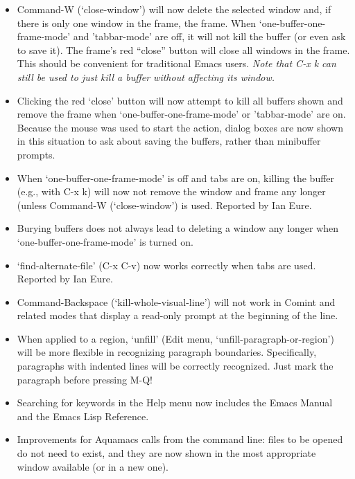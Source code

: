 \begin{itemize}
\item Command-W (`close-window') will now delete the selected window and, if there is only one window in the frame, the frame.  When `one-buffer-one-frame-mode' and 'tabbar-mode' are off, it will not kill the buffer (or even ask to save it).   The frame's red ``close'' button will close all windows in the frame.  This should be convenient for traditional Emacs users.  \emph{Note that C-x k can still be used to just kill a buffer without affecting its window.}

\item Clicking the red `close' button will now attempt to kill all buffers shown and remove the frame when `one-buffer-one-frame-mode' or 'tabbar-mode' are on.   Because the mouse was used to start the action, dialog boxes are now shown in this situation to ask about saving the buffers, rather than minibuffer prompts.

\item When `one-buffer-one-frame-mode' is off and tabs are on, killing the buffer (e.g., with C-x k) will now not remove the window and frame any longer (unless Command-W (`close-window') is used.
Reported by Ian Eure.

\item Burying buffers does not always lead to deleting a window any longer when `one-buffer-one-frame-mode' is turned on.

\item `find-alternate-file' (C-x C-v) now works correctly when tabs are used.  Reported by Ian Eure.

\item Command-Backspace (`kill-whole-visual-line') will not work in Comint and related modes that display a read-only prompt at the beginning of the line.

\item When applied to a region, `unfill' (Edit menu, `unfill-paragraph-or-region') will be more flexible in recognizing paragraph boundaries.  Specifically, paragraphs with indented lines will be correctly recognized.  Just mark the paragraph before pressing M-Q!

\item Searching for keywords in the Help menu now includes the Emacs Manual and the Emacs Lisp Reference.

\item Improvements for Aquamacs calls from the command line: files to be opened do not need to exist, and they are now shown in the most appropriate window available (or in a new one).


\end{itemize}
